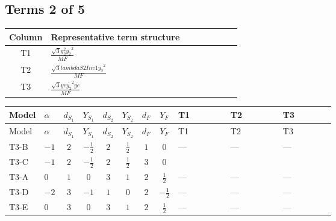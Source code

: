 \documentclass[8pt]{article}
\begin{document}
\begin{landscape}
\subsection*{Terms 2 of 5}
\begin{center}
\begin{tabular}{@{}c >{\raggedright\arraybackslash}p{0.82\linewidth}@{}}
\toprule
Column & Representative term structure \\
\midrule
T1 & \(\displaystyle \frac{\sqrt{3} g_{2}^{2} \overline{y_{2}}^{2}}{MF}\) \\
\midrule
T2 & \(\displaystyle \frac{\sqrt{3} lambdaS2Inv1 \overline{y_{2}}^{2}}{MF}\) \\
\midrule
T3 & \(\displaystyle \frac{\sqrt{3} ye \overline{y_{2}}^{2} \overline{ye}}{MF}\) \\
\midrule
\bottomrule
\end{tabular}
\end{center}
\smallskip
\tiny
\begin{longtable}{@{}llcccccc >{\raggedright\arraybackslash}p{0.21\linewidth} >{\raggedright\arraybackslash}p{0.21\linewidth} >{\raggedright\arraybackslash}p{0.21\linewidth}@{}}
\toprule
Model & $\alpha$ & $d_{S_1}$ & $Y_{S_1}$ & $d_{S_2}$ & $Y_{S_2}$ & $d_F$ & $Y_F$ & T1 & T2 & T3 \\
\midrule
\endfirsthead
\toprule
Model & $\alpha$ & $d_{S_1}$ & $Y_{S_1}$ & $d_{S_2}$ & $Y_{S_2}$ & $d_F$ & $Y_F$ & T1 & T2 & T3 \\
\midrule
\endhead
T3-B & $-1$ & $2$ & $-\frac{1}{2}$ & $2$ & $\frac{1}{2}$ & $1$ & $0$ & --- & --- & --- \\
\midrule
T3-C & $-1$ & $2$ & $-\frac{1}{2}$ & $2$ & $\frac{1}{2}$ & $3$ & $0$ & \scriptsize\adjustbox{max width=\linewidth}{$\begin{gathered} - \frac{\sqrt{3} g_{2}^{2} \overline{y_{2}}^{2}}{8 MF}\end{gathered}$} & \scriptsize\adjustbox{max width=\linewidth}{$\begin{gathered} - \frac{\sqrt{3} lambdaS2Inv1 \overline{y_{2}}^{2}}{12 MF}\end{gathered}$} & \scriptsize\adjustbox{max width=\linewidth}{$\begin{gathered} \frac{\sqrt{3} ye \overline{y_{2}}^{2} \overline{ye}}{24 MF}\end{gathered}$} \\
\midrule
T3-A & $0$ & $1$ & $0$ & $3$ & $1$ & $2$ & $\frac{1}{2}$ & --- & --- & --- \\
\midrule
T3-D & $-2$ & $3$ & $-1$ & $1$ & $0$ & $2$ & $-\frac{1}{2}$ & --- & --- & --- \\
\midrule
T3-E & $0$ & $3$ & $0$ & $3$ & $1$ & $2$ & $\frac{1}{2}$ & --- & --- & --- \\
\midrule
\bottomrule
\end{longtable}
\clearpage

\end{landscape}
\end{document}
